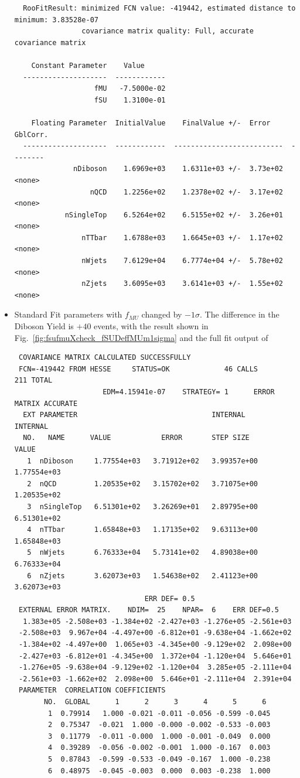 \begin{itemize}
{\begin{verbatim}
  RooFitResult: minimized FCN value: -419442, estimated distance to minimum: 3.83528e-07
                covariance matrix quality: Full, accurate covariance matrix

    Constant Parameter    Value     
  --------------------  ------------
                   fMU   -7.5000e-02
                   fSU    1.3100e-01

    Floating Parameter  InitialValue    FinalValue +/-  Error     GblCorr.
  --------------------  ------------  --------------------------  --------
              nDiboson    1.6969e+03    1.6311e+03 +/-  3.73e+02  <none>
                  nQCD    1.2256e+02    1.2378e+02 +/-  3.17e+02  <none>
            nSingleTop    6.5264e+02    6.5155e+02 +/-  3.26e+01  <none>
                nTTbar    1.6788e+03    1.6645e+03 +/-  1.17e+02  <none>
                nWjets    7.6129e+04    6.7774e+04 +/-  5.78e+02  <none>
                nZjets    3.6095e+03    3.6141e+03 +/-  1.55e+02  <none>

\end{verbatim}
}


\item Standard Fit parameters with $f_{MU}$ changed by $-1\sigma$. The difference in the Diboson Yield is $+40$ events, with the result shown in Fig.~\ref{fig:fsufmuXcheck_fSUDeffMUm1sigma} and the full fit output of
{\tiny
\begin{verbatim}
 COVARIANCE MATRIX CALCULATED SUCCESSFULLY
 FCN=-419442 FROM HESSE     STATUS=OK             46 CALLS         211 TOTAL
                     EDM=4.15941e-07    STRATEGY= 1      ERROR MATRIX ACCURATE 
  EXT PARAMETER                                INTERNAL      INTERNAL  
  NO.   NAME      VALUE            ERROR       STEP SIZE       VALUE   
   1  nDiboson     1.77554e+03   3.71912e+02   3.99357e+00   1.77554e+03
   2  nQCD         1.20535e+02   3.15702e+02   3.71075e+00   1.20535e+02
   3  nSingleTop   6.51301e+02   3.26269e+01   2.89795e+00   6.51301e+02
   4  nTTbar       1.65848e+03   1.17135e+02   9.63113e+00   1.65848e+03
   5  nWjets       6.76333e+04   5.73141e+02   4.89038e+00   6.76333e+04
   6  nZjets       3.62073e+03   1.54638e+02   2.41123e+00   3.62073e+03
                               ERR DEF= 0.5
 EXTERNAL ERROR MATRIX.    NDIM=  25    NPAR=  6    ERR DEF=0.5
  1.383e+05 -2.508e+03 -1.384e+02 -2.427e+03 -1.276e+05 -2.561e+03 
 -2.508e+03  9.967e+04 -4.497e+00 -6.812e+01 -9.638e+04 -1.662e+02 
 -1.384e+02 -4.497e+00  1.065e+03 -4.345e+00 -9.129e+02  2.098e+00 
 -2.427e+03 -6.812e+01 -4.345e+00  1.372e+04 -1.120e+04  5.646e+01 
 -1.276e+05 -9.638e+04 -9.129e+02 -1.120e+04  3.285e+05 -2.111e+04 
 -2.561e+03 -1.662e+02  2.098e+00  5.646e+01 -2.111e+04  2.391e+04 
 PARAMETER  CORRELATION COEFFICIENTS  
       NO.  GLOBAL      1      2      3      4      5      6
        1  0.79914   1.000 -0.021 -0.011 -0.056 -0.599 -0.045
        2  0.75347  -0.021  1.000 -0.000 -0.002 -0.533 -0.003
        3  0.11779  -0.011 -0.000  1.000 -0.001 -0.049  0.000
        4  0.39289  -0.056 -0.002 -0.001  1.000 -0.167  0.003
        5  0.87843  -0.599 -0.533 -0.049 -0.167  1.000 -0.238
        6  0.48975  -0.045 -0.003  0.000  0.003 -0.238  1.000


\end{verbatim}}
\end{itemize}
